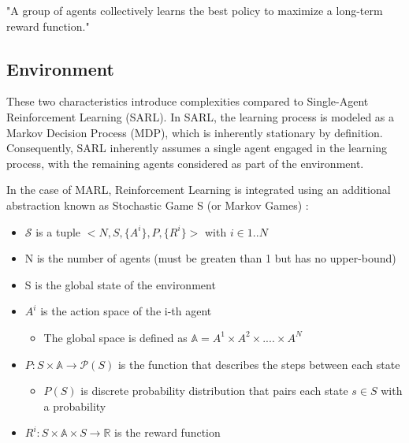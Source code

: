 \documentclass{scrartcl}
\begin{document}
"A group of agents collectively learns the best policy to maximize a long-term reward function."

\subsection{Environment}
These two characteristics introduce complexities compared to Single-Agent Reinforcement 
Learning (SARL). In SARL, the learning process is modeled as a Markov Decision Process (MDP),
 which is inherently stationary by definition. Consequently, SARL inherently assumes a single
  agent engaged in the learning process, with the remaining agents considered as part of the 
  environment.

In the case of MARL, Reinforcement Learning is integrated using an additional abstraction 
known as Stochastic Game S (or Markov Games) \cite{LITTMAN1994157}:

\begin{itemize}
  \item $\mathcal{S}$ is a tuple $<N, S, \{A^i\}, P,  \{R^i\}>$ with $i \in 1..N$
  \item N is the number of agents (must be greaten than 1 but has no upper-bound)
  \item S is the global state of the environment
  \item $A^i$ is the action space of the i-th agent
  \begin{itemize}
       \item The global space is defined as $\mathbb{A} = A^1 \times A^2 \times .... \times A^N$
  \end{itemize}
  \item $P: S \times \mathbb{A} \rightarrow \mathcal{P}(S)$ is the function that describes the steps between each state
  \begin{itemize}
      \item $P(S)$ is discrete probability distribution that pairs each state $s \in S$ with a probability
  \end{itemize}
  \item $R^i: S \times \mathbb{A} \times S \rightarrow \mathbb{R}$ is the reward function
\end{itemize}
\end{document}
